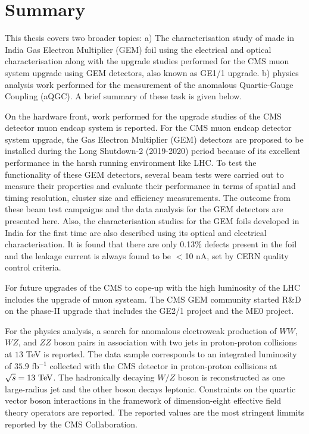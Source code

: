 \chapter{Summary} %
\label{cha:summary_&_outlook}
This thesis covers two broader topics: a) The characterisation study of made in India Gas Electron Multiplier (GEM) foil using the electrical and optical characterisation along with the upgrade studies performed for the CMS muon system upgrade using GEM detectors, also known as GE1/1 upgrade. b) physics analysis work performed for the measurement of the anomalous Quartic-Gauge Coupling (aQGC). A brief summary of these task is given below.

On the hardware front, work performed for the upgrade studies of the CMS detector muon endcap system is reported. For the CMS muon endcap detector system upgrade, the Gas Electron Multiplier (GEM) detectors are proposed to be installed during the Long Shutdown-2 (2019-2020) period because of its excellent performance in the harsh running environment like LHC. To test the functionality of these GEM detectors, several beam tests were carried out to measure their properties and evaluate their performance in terms of spatial and timing resolution, cluster size and efficiency measurements. The outcome from these beam test campaigns and the data analysis for the GEM detectors are presented here. Also, the characterisation studies for the GEM foils developed in India for the first time are also described using its optical and electrical characterisation. It is found that there are only 0.13\% defects present in the foil and the leakage current is always found to be $<$10 nA, set by CERN quality control criteria.

For future upgrades of the CMS to cope-up with the high luminosity of the LHC includes the upgrade of muon systeam. The CMS GEM community started R\&D on the phase-II upgrade that includes the GE2/1 project and the ME0 project.

For the physics analysis, a search for anomalous electroweak production of $WW$, $WZ$, and $ZZ$ boson pairs in association with two jets in proton-proton collisions at $13$ TeV is reported. The data sample corresponds to an integrated luminosity of $35.9$ fb$^{-1}$ collected with the CMS detector in proton-proton collisions at $\sqrt{s}=13~\mathrm{TeV}$. The hadronically decaying $W/Z$ boson is reconstructed as one large-radius jet and the other boson decays leptonic. Constraints on the quartic vector boson interactions in the framework of dimension-eight effective field theory operators are reported. The reported values are the most stringent limmits reported by the CMS Collaboration. 


